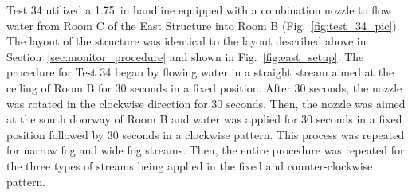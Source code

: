 \documentclass[12pt,oneside]{book}
\begin{document}
Test 34 utilized a 1.75~in handline equipped with a combination nozzle to flow water from Room C of the East Structure into Room B (Fig.~\ref{fig:test_34_pic}). The layout of the structure was identical to the layout described above in Section~\ref{sec:monitor_procedure} and shown in Fig.~\ref{fig:east_setup}. The procedure for Test 34 began by flowing water in a straight stream aimed at the ceiling of Room B for 30 seconds in a fixed position. After 30 seconds, the nozzle was rotated in the clockwise direction for 30 seconds. Then, the nozzle was aimed at the south doorway of Room B and water was applied for 30 seconds in a fixed position followed by 30 seconds in a clockwise pattern. This process was repeated for narrow fog and wide fog streams. Then, the entire procedure was repeated for the three types of streams being applied in the fixed and counter-clockwise pattern.
\end{document}
